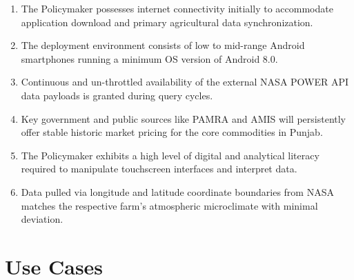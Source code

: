 \begin{enumerate}
    \item The Policymaker possesses internet connectivity initially to accommodate application download and primary agricultural data synchronization.
    \item The deployment environment consists of low to mid-range Android smartphones running a minimum OS version of Android 8.0.
    \item Continuous and un-throttled availability of the external NASA POWER API data payloads is granted during query cycles.
    \item Key government and public sources like PAMRA and AMIS will persistently offer stable historic market pricing for the core commodities in Punjab.
    \item The Policymaker exhibits a high level of digital and analytical literacy required to manipulate touchscreen interfaces and interpret data.
    \item Data pulled via longitude and latitude coordinate boundaries from NASA matches the respective farm's atmospheric microclimate with minimal deviation.
\end{enumerate}

\section{Use Cases}

